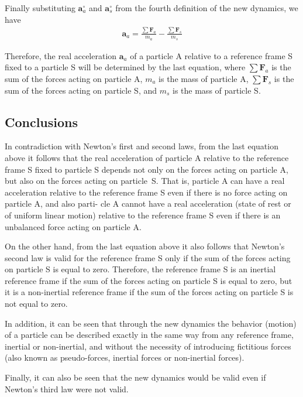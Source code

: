\documentclass[11pt]{article}
\newcommand{\vA}{\mathbf{a}}
\newcommand{\vF}{\mathbf{F}}
\newcommand{\mM}{m}
\newcommand{\ra}{_a}
\newcommand{\rs}{_s}
\begin{document}
\newpage \baselineskip=14.40pt

\par Finally substituting $\vA^{\circ}\ra$ and $\vA^{\circ}\rs$ from the fourth definition of the new dynamics, we have
\begin{eqnarray*}
\vA\ra = \frac{\sum \vF\ra}{\mM\ra} - \frac{\sum \vF\rs}{\mM\rs}
\end{eqnarray*}
\par Therefore, the real acceleration $\vA\ra$ of a particle A relative to a reference frame S fixed to a particle S will be determined by the last equation, where $\sum \vF\ra$ is the sum of the forces acting on particle A, $\mM\ra$ is the mass of particle A, $\sum \vF\rs$ is the sum of the forces acting on particle S, and $\mM\rs$ is the mass of particle S.

\vspace{-0.9em}

{\centering\subsection*{Conclusions}}

\par In contradiction with Newton's first and second laws, from the last equation above it follows that the real acceleration of particle A relative to the reference frame S fixed to particle S depends not only on the forces acting on particle A, but also on the forces acting on \hbox {particle S}. That is, particle A can have a real acceleration relative to the reference frame S even if there is no force acting on particle A, and also parti- cle A cannot have a real acceleration (state of rest or of uniform linear motion) relative to the reference frame S even if there is an unbalanced force acting on particle A.
\medskip
\par On the other hand, from the last equation above it also follows that Newton's second law is valid for the reference frame S only if the sum of the forces acting on particle S is equal to zero. Therefore, the reference frame S is an inertial reference frame if the sum of the forces acting on particle S is equal to zero, but it is a non-inertial reference frame if the sum of the forces acting on particle S is not equal to zero.
\medskip
\par In addition, it can be seen that through the new dynamics the behavior (motion) of a particle can be described exactly in the same way from any reference frame, inertial or non-inertial, and without the necessity of introducing fictitious forces (also known as pseudo-forces, \hbox {inertial} forces or non-inertial forces).
\medskip
\par Finally, it can also be seen that the new dynamics would be valid even if Newton's third law were not valid.
\end{document}

